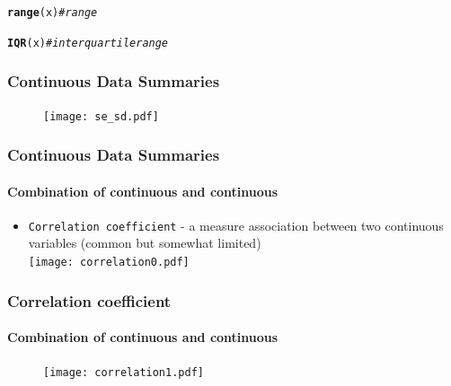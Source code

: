 \documentclass{beamer}\usepackage[]{graphicx}\usepackage[]{color}
\makeatletter
\newcommand{\hlstr}[1]{\textcolor[rgb]{0.192,0.494,0.8}{#1}}%
\newcommand{\hlcom}[1]{\textcolor[rgb]{0.678,0.584,0.686}{\textit{#1}}}%
\newcommand{\hlopt}[1]{\textcolor[rgb]{0,0,0}{#1}}%
\newcommand{\hlstd}[1]{\textcolor[rgb]{0.345,0.345,0.345}{#1}}%
\newcommand{\hlkwc}[1]{\textcolor[rgb]{0.333,0.667,0.333}{#1}}%
\newcommand{\hlkwd}[1]{\textcolor[rgb]{0.737,0.353,0.396}{\textbf{#1}}}%
\newenvironment{kframe}{%
 \def\at@end@of@kframe{}%
 \ifinner\ifhmode%
  \def\at@end@of@kframe{\end{minipage}}%
  \begin{minipage}{\columnwidth}%
 \fi\fi%
 \def\FrameCommand##1{\hskip\@totalleftmargin \hskip-\fboxsep
 \colorbox{shadecolor}{##1}\hskip-\fboxsep
     \hskip-\linewidth \hskip-\@totalleftmargin \hskip\columnwidth}%
 \MakeFramed {\advance\hsize-\width
   \@totalleftmargin\z@ \linewidth\hsize
   \@setminipage}}%
 {\par\unskip\endMakeFramed%
 \at@end@of@kframe}
\newenvironment{knitrout}{}{} %
\makeatother
\begin{document}
{{{\begin{frame}[fragile]
\begin{knitrout}
\begin{kframe}
\begin{alltt}
\hlkwd{range}\hlstd{(x)} \hlcom{# range}

\hlkwd{IQR}\hlstd{(x)} \hlcom{# interquartile range}
\end{alltt}
\end{kframe}
\end{knitrout}
\end{frame}


\usebackgroundtemplate{}
\begin{frame}[plain]
\frametitle{Continuous Data Summaries}
\begin{figure}
\texttt{[image: se\_sd.pdf]}
\end{figure}
\end{frame}


\begin{frame}
\frametitle{Continuous Data Summaries}
\framesubtitle{Combination of continuous and continuous}
\begin{itemize}
\item {\tt Correlation coefficient} - a measure association between two continuous variables (common but somewhat limited)\\\vspace{0.3cm}
\texttt{[image: correlation0.pdf]}
\end{itemize}
\end{frame}


\begin{frame}[plain]
\frametitle{Correlation coefficient}
\framesubtitle{Combination of continuous and continuous}
\begin{figure}
\texttt{[image: correlation1.pdf]}
\end{figure}
\end{frame}


}}}
\end{document}
